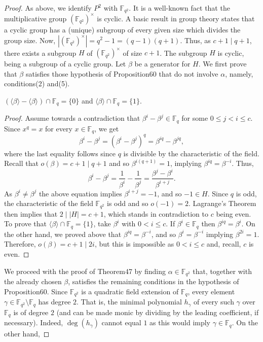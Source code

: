 \begin{proof}
As above, we identify $P^2$ with $\mathbb F_{q^2}$. It is a well-known fact that the multiplicative group $(\mathbb F_{q^2})^\times$ is cyclic. A basic result in group theory states that a cyclic group has a (unique) subgroup of every given size which divides the group size. Now, $|(\mathbb F_{q^2})^\times|=q^2-1=(q-1)(q+1)$. Thus, as $c+1\mid q+1$, there exists a subgroup $H$ of $(\mathbb F_{q^2})^\times$ of size $c+1$. The subgroup $H$ is cyclic, being a subgroup of a cyclic group. Let $\beta$ be a generator for $H$. We first prove that $\beta$ satisfies those hypothesis of Proposition60 that do not involve $\alpha$, namely, conditions(2) and(5).
\begin{ntclaim}
$(\langle\beta\rangle-\langle\beta\rangle)\cap\mathbb F_q=\{0\}$ and $\langle\beta\rangle\cap\mathbb F_q=\{1\}$.
\end{ntclaim}
\begin{proof}
Assume towards a contradiction that $\beta^i-\beta^j\in\mathbb F_q$ for some $0\leq j<i\leq c$. Since $x^q=x$ for every $x\in\mathbb F_q$, we get
\[\beta^i-\beta^j=(\beta^i-\beta^j)^q=\beta^{iq}-\beta^{jq},\]
where the last equality follows since $q$ is divisible by the characteristic of the field. Recall that $o(\beta)=c+1\mid q+1$ and so $\beta^{i(q+1)}=1$, implying $\beta^{iq}=\beta^{-i}$. Thus,
\[\beta^i-\beta^j=\frac1{\beta^i}-\frac1{\beta^j}=\frac{\beta^j-\beta^i}{\beta^{i+j}}.\]
As $\beta^i\ne\beta^j$ the above equation implies $\beta^{i+j}=-1$, and so $-1\in H$. Since $q$ is odd, the characteristic of the field $\mathbb F_{q^2}$ is odd and so $o(-1)=2$. Lagrange's Theorem then implies that $2\mid|H|=c+1$, which stands in contradiction to $c$ being even.
To prove that $\langle\beta\rangle\cap\mathbb F_q=\{1\}$, take $\beta^i$ with $0<i\leq c$. If $\beta^i\in\mathbb F_q$ then $\beta^{iq}=\beta^i$. On the other hand, we proved above that $\beta^{iq}=\beta^{-i}$, and so $\beta^i=\beta^{-i}$ implying $\beta^{2i}=1$. Therefore, $o(\beta)=c+1\mid2i$, but this is impossible as $0<i\leq c$ and, recall, $c$ is even.
\end{proof}
We proceed with the proof of Theorem47 by finding $\alpha\in\mathbb F_{q^2}$ that, together with the already chosen $\beta$, satisfies the remaining conditions in the hypothesis of Proposition60. Since $\mathbb F_{q^2}$ is a quadratic field extension of $\mathbb F_q$, every element $\gamma\in\mathbb F_{q^2}\setminus\mathbb F_q$ has degree $2$. That is, the minimal polynomial $h_\gamma$ of every such $\gamma$ over $\mathbb F_q$ is of degree $2$ (and can be made monic by dividing by the leading coefficient, if necessary). Indeed, $\deg(h_\gamma)$ cannot equal $1$ as this would imply $\gamma\in\mathbb F_q$. On the other hand,

\end{proof}
